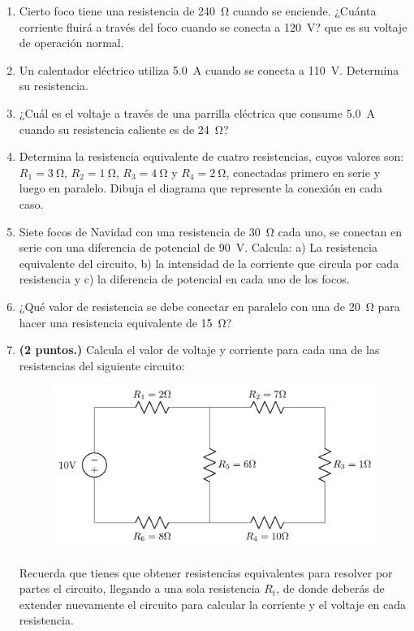 \documentclass[14pt]{extarticle}
\begin{document}
\begin{enumerate}
\item Cierto foco tiene una resistencia de \SI{240}{\ohm} cuando se enciende. ¿Cuánta corriente fluirá a través del foco cuando se conecta a \SI{120}{\volt}? que es su voltaje de operación normal.
\item Un calentador eléctrico utiliza \SI{5.0}{\ampere} cuando se conecta a \SI{110}{\volt}. Determina su resistencia.
\item ¿Cuál es el voltaje a través de una parrilla eléctrica que consume \SI{5.0}{\ampere} cuando su resistencia caliente es de \SI{24}{\ohm}?
\item Determina la resistencia equivalente de cuatro resistencias, cuyos valores son: $R_{1} = \SI{3}{\ohm}$, $R_{2} = \SI{1}{\ohm}$, $R_{3} = \SI{4}{\ohm}$ y $R_{4} = \SI{2}{\ohm}$, conectadas primero en  serie y luego en paralelo. Dibuja el diagrama que represente la conexión en cada caso.
\item Siete focos de Navidad con una resistencia de \SI{30}{\ohm} cada uno, se conectan en serie con una diferencia de potencial de \SI{90}{\volt}. Calcula: a) La resistencia equivalente del circuito, b) la intensidad de la corriente que circula por cada resistencia y c) la diferencia de potencial en cada uno de los focos.
\item ¿Qué valor de resistencia se debe conectar en paralelo con una de \SI{20}{\ohm} para hacer una resistencia equivalente de \SI{15}{\ohm}?
\item \textbf{(2 puntos.) }Calcula el valor de voltaje y corriente para cada una de las resistencias del siguiente circuito:
\begin{figure}[H]
    \centering
    \includegraphics[scale=1.2]{Imagenes/Circuito_01.png}
\end{figure}
Recuerda que tienes que obtener resistencias equivalentes para resolver por partes el circuito, llegando a una sola resistencia $R_{t}$, de donde deberás de extender nuevamente el circuito para calcular la corriente y el voltaje en cada resistencia.
\end{enumerate}
\end{document}
